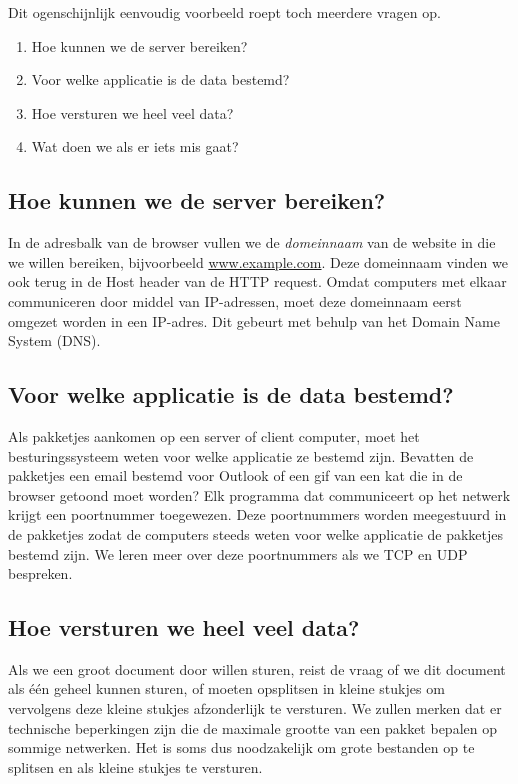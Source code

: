 Dit ogenschijnlijk eenvoudig voorbeeld roept toch meerdere vragen op.
\begin{enumerate}
\item Hoe kunnen we de server bereiken?
\item Voor welke applicatie is de data bestemd?
\item Hoe versturen we heel veel data?
\item Wat doen we als er iets mis gaat?
\end{enumerate}



\subsection{Hoe kunnen we de server bereiken?}
In de adresbalk van de browser vullen we de \emph{domeinnaam} van de website in die we willen bereiken, bijvoorbeeld \url{www.example.com}.
Deze domeinnaam vinden we ook terug in de Host header van de HTTP request.
Omdat computers met elkaar communiceren door middel van IP-adressen, moet deze domeinnaam eerst omgezet worden in een IP-adres.
Dit gebeurt met behulp van het Domain Name System (DNS).

\subsection{Voor welke applicatie is de data bestemd?}
Als pakketjes aankomen op een server of client computer, moet het besturingssysteem weten voor welke applicatie ze bestemd zijn.
Bevatten de pakketjes een email bestemd voor Outlook of een gif van een kat die in de browser getoond moet worden?
Elk programma dat communiceert op het netwerk krijgt een poortnummer toegewezen.
Deze poortnummers worden meegestuurd in de pakketjes zodat de computers steeds weten voor welke applicatie de pakketjes bestemd zijn.
We leren meer over deze poortnummers als we TCP en UDP bespreken.

\subsection{Hoe versturen we heel veel data?}
Als we een groot document door willen sturen, reist de vraag of we dit document als één geheel kunnen sturen, of moeten opsplitsen in kleine stukjes om vervolgens deze kleine stukjes afzonderlijk te versturen.
We zullen merken dat er technische beperkingen zijn die de maximale grootte van een pakket bepalen op sommige netwerken.
Het is soms dus noodzakelijk om grote bestanden op te splitsen en als kleine stukjes te versturen.

